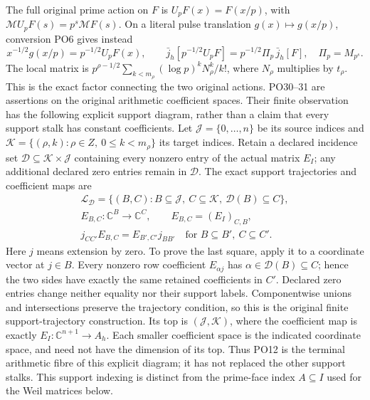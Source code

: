 \documentclass[11pt,a4paper]{article}
\theoremstyle{definition}\newtheorem{definition}[theorem]{Definition}
\newcommand{\C}{\mathbb C}\newcommand{\R}{\mathbb R}
\begin{document}
The full original prime action on \(F\) is
\(U_pF(x)=F(x/p)\), with \(\mathcal M U_pF(s)=p^s\mathcal M F(s)\).
On a literal pulse translation \(g(x)\mapsto g(x/p)\),
conversion PO6 gives instead
\[
 x^{-1/2}g(x/p)=p^{-1/2}U_pF(x),\qquad
 \bar j_h[p^{-1/2}U_pF]
    =p^{-1/2}\Pi_p\,\bar j_h[F],\quad
 \Pi_p=M_{p^s}.
 \tag{PO31}\label{PO:po:prime-factor}
\]
The local matrix is
\(p^{\rho-1/2}\sum_{k<m_\rho}
(\log p)^kN_\rho^k/k!\), where \(N_\rho\) multiplies by
\(t_\rho\). This is the exact factor connecting the two
original actions.
PO30--31 are assertions on the original arithmetic coefficient
spaces. Their finite observation has the following explicit
support diagram, rather than a claim that every support stalk
has constant coefficients. Let \(\mathcal J=\{0,\ldots,n\}\)
be its source indices and
\(\mathcal K=\{(\rho,k):\rho\in Z,\ 0\le k<m_\rho\}\)
its target indices. Retain a declared incidence set
\(\mathcal D\subseteq\mathcal K\times\mathcal J\) containing
every nonzero entry of the actual matrix \(E_I\); any additional
declared zero entries remain in \(\mathcal D\).
The exact support trajectories and coefficient maps are
\[
 \begin{gathered}
 \mathcal L_{\mathcal D}
  =\{(B,C):B\subseteq\mathcal J,\ C\subseteq\mathcal K,\
                         \mathcal D(B)\subseteq C\},\\
 E_{B,C}:\C^B\longrightarrow\C^C,\qquad
 E_{B,C}=(E_I)_{C,B},\\
 j_{CC'}E_{B,C}=E_{B',C'}j_{BB'}
       \quad\text{for }B\subseteq B',\ C\subseteq C'.
 \end{gathered}
 \tag{PO54}\label{PO:po:support-square}
\]
Here \(j\) means extension by zero. To prove the last square,
apply it to a coordinate vector at \(j\in B\).
Every nonzero row coefficient \(E_{\alpha j}\) has
\(\alpha\in\mathcal D(B)\subseteq C\); hence the two sides
have exactly the same retained coefficients in \(C'\).
Declared zero entries change neither equality nor their
support labels. Componentwise unions and intersections preserve
the trajectory condition, so this is the original finite
support-trajectory construction. Its top is
\((\mathcal J,\mathcal K)\), where the coefficient map is
exactly \(E_I:\C^{n+1}\to A_h\).
Each smaller coefficient space is the indicated coordinate
space, and need not have the dimension of its top.
Thus PO12 is the terminal arithmetic fibre of this explicit
diagram; it has not replaced the other support stalks.
This support indexing is distinct from the prime-face index
\(A\subseteq I\) used for the Weil matrices below.
\end{document}
